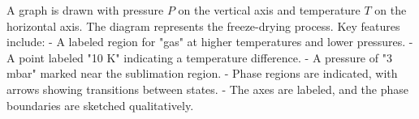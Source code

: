 A graph is drawn with pressure \( P \) on the vertical axis and temperature \( T \) on the horizontal axis. The diagram represents the freeze-drying process. Key features include:  
- A labeled region for "gas" at higher temperatures and lower pressures.  
- A point labeled "10 K" indicating a temperature difference.  
- A pressure of "3 mbar" marked near the sublimation region.  
- Phase regions are indicated, with arrows showing transitions between states.  
- The axes are labeled, and the phase boundaries are sketched qualitatively.